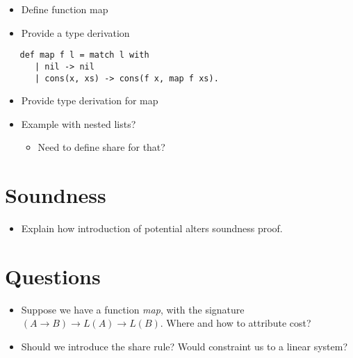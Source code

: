 \begin{itemize}
   \item Define function map
   \item Provide a type derivation
\end{itemize}

\begin{verbatim}
   def map f l = match l with 
      | nil -> nil
      | cons(x, xs) -> cons(f x, map f xs).
\end{verbatim}

\begin{itemize}
   \item Provide type derivation for map
   \item Example with nested lists?
      \begin{itemize}
         \item Need to define share for that?
      \end{itemize}
\end{itemize}

\section{Soundness}
\begin{itemize}
   \item Explain how introduction of potential alters soundness proof.
\end{itemize}

\section{Questions}

\begin{itemize}
   \item Suppose we have a function \emph{map}, with the signature \((A \to B) \to L(A) \to L(B)\). Where and how to attribute cost?
   \item Should we introduce the share rule? Would constraint us to a linear system?
\end{itemize}

